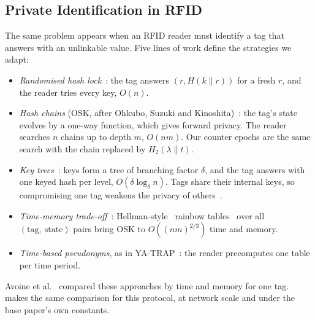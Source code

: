 \subsection{Private Identification in RFID}
The same problem appears when an RFID reader must identify a tag that answers with an unlinkable value. Five lines of work
define the strategies we adapt:
\begin{itemize}
\item \emph{Randomised hash lock}~\cite{weis}: the tag answers $(r, H(k\|r))$ for a fresh $r$, and the reader tries every
key, $O(n)$.
\item \emph{Hash chains} (OSK, after Ohkubo, Suzuki and Kinoshita)~\cite{ohkubo}: the tag's state evolves by a one-way
function, which gives forward privacy. The reader searches $n$ chains up to depth $m$, $O(nm)$. Our counter epochs are the
same search with the chain replaced by $H_2(\lambda\|t)$.
\item \emph{Key trees}~\cite{molnar}: keys form a tree of branching factor $\delta$, and the tag answers with one keyed
hash per level, $O(\delta\log_\delta n)$. Tags share their internal keys, so compromising one tag weakens the privacy of
others~\cite{ado05}.
\item \emph{Time-memory trade-off}~\cite{avoine05,ado05}: Hellman-style~\cite{hellman} rainbow tables~\cite{oechslin}
over all $(\text{tag},\ \text{state})$ pairs bring OSK to $O((nm)^{2/3})$ time and memory.
\item \emph{Time-based pseudonyms}, as in YA-TRAP~\cite{tsudik}: the reader precomputes one table per time period.
\end{itemize}

\ifshortpaper\else
Avoine et al.~\cite{ado05} compared these approaches by time and memory for one tag.  makes the same
comparison for this protocol, at network scale and under the base paper's own constants.
\fi

